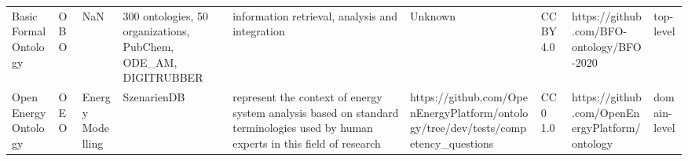 \begin{tabular}{m{5cm}m{2cm}m{5cm}m{2cm}m{2cm}m{2cm}m{2cm}m{2cm}m{2cm}}
                                                            Basic Formal Ontology &                     OBO &                                         NaN &                                                                                                                                                                                                                                                                                                       300 ontologies, 50 organizations, PubChem, ODE_AM, DIGITRUBBER &                                                                                                                                                                                                                                                                                                                                                        information retrieval, analysis and integration &                                                                                                            Unknown &                                    CC BY 4.0 &                                                          https://github.com/BFO-ontology/BFO-2020  &         top-level \\
                                                             Open Energy Ontology &                     OEO &                            Energy Modelling &                                                                                                                                                                                                                                                                                                                                                          SzenarienDB &                                                                                                                                                                                                                                                                        represent the context of energy system analysis based on standard terminologies used by human experts in this field of research &                                 https://github.com/OpenEnergyPlatform/ontology/tree/dev/tests/competency_questions &                                      CC0 1.0 &                                                     https://github.com/OpenEnergyPlatform/ontology &      domain-level \\

\end{tabular}
